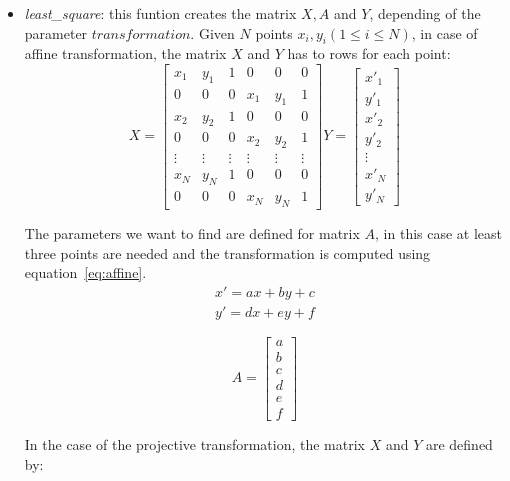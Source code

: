 \begin{itemize}
	\item \textit{least\_square}: this funtion creates the matrix $X,A$ and $Y$, depending of the parameter $transformation$. Given $N$ points $x_i, y_i (1\leq i\leq N ) $, in case of affine transformation, the matrix $X$ and $Y$ has to rows for each point:  
\[
X = 
\begin{bmatrix}
    x_{1}       & y_{1} & 1 & 0 & 0 & 0 \\
    0       & 0 & 0 & x_1 & y_1 & 1 \\
    x_{2}       & y_{2} & 1 & 0 & 0 & 0 \\
    0       & 0 & 0 & x_2 & y_2 & 1 \\
  \vdots & \vdots & \vdots & \vdots & \vdots & \vdots \\

    x_{N}       & y_{N} & 1 & 0 & 0 & 0 \\
    0       & 0 & 0 & x_N & y_N & 1 
\end{bmatrix}
%
Y = 
\begin{bmatrix}
    x'_{1} \\
    y'_{1} \\
    x'_{2}      \\
    y'_{2}   \\
 \vdots \\
    x'_{N}      \\
    y'_{N}   
\end{bmatrix}
\]

The parameters we want to find are defined for matrix $A$, in this case at least three points are needed and the transformation is computed using equation~\ref{eq:affine}.
\begin{equation}
\begin{split}
x'= ax+by+c \\
y'= dx+ey+f
\end{split}
\label{eq:affine}
\end{equation}

\[
A = 
\begin{bmatrix}
    a \\
    b \\
    c      \\
    d   \\ 
    e      \\
    f   
\end{bmatrix}
\]

In the case of the projective transformation, the matrix $X$ and $Y$ are defined by:


\end{itemize}
